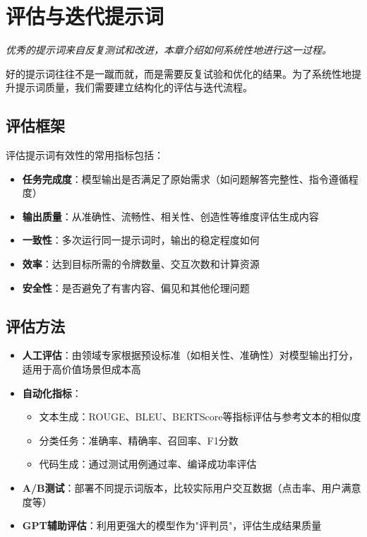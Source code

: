 \documentclass[12pt]{ctexart}
\newcommand{\chapternote}[1]{\vspace{-0.3cm}\par\noindent\textit{\small #1}\vspace{0.3cm}}
\begin{document}
\section{评估与迭代提示词}
\chapternote{优秀的提示词来自反复测试和改进，本章介绍如何系统性地进行这一过程。}

好的提示词往往不是一蹴而就，而是需要反复试验和优化的结果。为了系统性地提升提示词质量，我们需要建立结构化的评估与迭代流程。

\subsection{评估框架}
评估提示词有效性的常用指标包括：
\begin{itemize}
    \item \textbf{任务完成度}：模型输出是否满足了原始需求（如问题解答完整性、指令遵循程度）
    \item \textbf{输出质量}：从准确性、流畅性、相关性、创造性等维度评估生成内容
    \item \textbf{一致性}：多次运行同一提示词时，输出的稳定程度如何
    \item \textbf{效率}：达到目标所需的令牌数量、交互次数和计算资源
    \item \textbf{安全性}：是否避免了有害内容、偏见和其他伦理问题
\end{itemize}

\subsection{评估方法}
\begin{itemize}
    \item \textbf{人工评估}：由领域专家根据预设标准（如相关性、准确性）对模型输出打分，适用于高价值场景但成本高
    \item \textbf{自动化指标}：
    \begin{itemize}
        \item 文本生成：ROUGE、BLEU、BERTScore等指标评估与参考文本的相似度
        \item 分类任务：准确率、精确率、召回率、F1分数
        \item 代码生成：通过测试用例通过率、编译成功率评估
    \end{itemize}
    \item \textbf{A/B测试}：部署不同提示词版本，比较实际用户交互数据（点击率、用户满意度等）
    \item \textbf{GPT辅助评估}：利用更强大的模型作为"评判员"，评估生成结果质量
\end{itemize}
\end{document}
